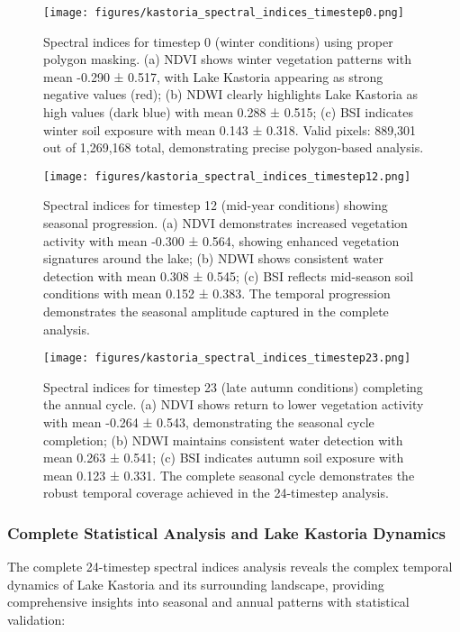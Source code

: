 \documentclass[a4paper,12pt]{article}
\begin{document}
\begin{figure}[H]
    \centering
    \texttt{[image: figures/kastoria\_spectral\_indices\_timestep0.png]}
    \caption{Spectral indices for timestep 0 (winter conditions) using proper polygon masking. (a) NDVI shows winter vegetation patterns with mean -0.290 ± 0.517, with Lake Kastoria appearing as strong negative values (red); (b) NDWI clearly highlights Lake Kastoria as high values (dark blue) with mean 0.288 ± 0.515; (c) BSI indicates winter soil exposure with mean 0.143 ± 0.318. Valid pixels: 889,301 out of 1,269,168 total, demonstrating precise polygon-based analysis.}
    \label{fig:spectral_t0}
\end{figure}

\begin{figure}[H]
    \centering
    \texttt{[image: figures/kastoria\_spectral\_indices\_timestep12.png]}
    \caption{Spectral indices for timestep 12 (mid-year conditions) showing seasonal progression. (a) NDVI demonstrates increased vegetation activity with mean -0.300 ± 0.564, showing enhanced vegetation signatures around the lake; (b) NDWI shows consistent water detection with mean 0.308 ± 0.545; (c) BSI reflects mid-season soil conditions with mean 0.152 ± 0.383. The temporal progression demonstrates the seasonal amplitude captured in the complete analysis.}
    \label{fig:spectral_t12}
\end{figure}

\begin{figure}[H]
    \centering
    \texttt{[image: figures/kastoria\_spectral\_indices\_timestep23.png]}
    \caption{Spectral indices for timestep 23 (late autumn conditions) completing the annual cycle. (a) NDVI shows return to lower vegetation activity with mean -0.264 ± 0.543, demonstrating the seasonal cycle completion; (b) NDWI maintains consistent water detection with mean 0.263 ± 0.541; (c) BSI indicates autumn soil exposure with mean 0.123 ± 0.331. The complete seasonal cycle demonstrates the robust temporal coverage achieved in the 24-timestep analysis.}
    \label{fig:spectral_t23}
\end{figure}

\subsubsection{Complete Statistical Analysis and Lake Kastoria Dynamics}

The complete 24-timestep spectral indices analysis reveals the complex
temporal dynamics of Lake Kastoria and its surrounding landscape, providing
comprehensive insights into seasonal and annual patterns with statistical validation:
\end{document}

